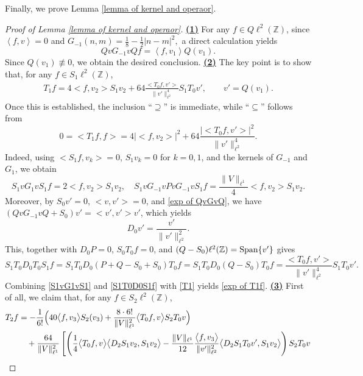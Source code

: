 \documentclass[reqno, 11pt]{amsart}
\newcommand\Z{\mathbb{Z}}
\numberwithin{equation}{section}
\begin{document}
Finally, we prove Lemma \ref{lemma of kernel and operaor}.
\begin{proof}[Proof of Lemma {\ref{lemma of kernel and operaor}}]
{\bf{\underline{(1)}}} For any $f\in Q\ell^{2}(\Z)$, since $\left<f,v\right>=0$ and $G_{-1}(n,m)=\frac{1}{8}-\frac{1}{2}|n-m|^2,$
a direct calculation yields
\begin{equation}\label{exp of QvGvQ}
QvG_{-1}vQf=\left<f,v_1\right>Q(v_1).
\end{equation}
Since $Q(v_1)\not\equiv0$, we obtain the desired conclusion. 
\vskip0.1cm
{\bf{\underline{(2)}}} The key point is to show that, for any $f\in S_1\ell^2(\Z)$,
\begin{align}\label{exp of T1f}
T_1f=4\big<f,v_2\big>S_1v_2+64\frac{\big<T_0f,v'\big>}{\|v'\|^4_{\ell^2}}S_1T_0v',\qquad v'=Q(v_1).
\end{align}
Once this is established, the inclusion ``$\supseteq$'' is immediate, while ``$\subseteq$'' follows from
$$0=\big<T_1f,f\big>=4\left|\big<f,v_2\big>\right|^2+64\frac{\left|\big<T_0f,v'\big>\right|^2}{\|v'\|^4_{\ell^2}}.$$
Indeed, using $\big<S_1f,v_k\big>=0$, $S_1v_k=0$ for $k=0,1$, and the kernels of $G_{-1}$ and $G_1$, we obtain
\begin{equation}\label{S1vG1vS1}
S_1vG_1vS_1f=2\big<f,v_2\big>S_1v_2,\quad S_1vG_{-1}vPvG_{-1}vS_1f=\frac{\|V\|_{\ell^1}}{4}\big<f,v_2\big>S_1v_2.
\end{equation}
Moreover, by $S_0v'=0$, $\big<v,v'\big>=0$, and \eqref{exp of QvGvQ}, we have
$(QvG_{-1}vQ+S_0)v'=\big<v',v'\big>v'$, which yields
\begin{equation}\label{D0v}
D_0v'=\frac{v'}{\|v'\|^2_{\ell^2}}.
\end{equation}
This, together with $D_0P=0$, $S_0T_0f=0$, and $(Q-S_0)\ell^2(\Z)={\rm Span}\{v'\}$ gives
\begin{equation}\label{S1T0D0S1f}
S_1T_0D_0T_0S_1f=S_1T_0D_0(P+Q-S_0+S_0)T_0f=S_1T_0D_0(Q-S_0)T_0f=\frac{\big<T_0f,v'\big>}{\|v'\|^4_{\ell^2}}S_1T_0v'.
\end{equation}
Combining \eqref{S1vG1vS1} and \eqref{S1T0D0S1f} with \eqref{T1} yields \eqref{exp of T1f}.
\vskip0.1cm
{\bf{\underline{(3)}}} First of all, we claim that, for any $f\in S_2\ell^2(\Z)$,
\begin{align}\label{exp of T2f}
T_2f&=-\frac{1}{6!}\Big(40\big<f,v_3\big>S_2(v_3)+\frac{8\cdot6!}{\|V\|^2_{\ell^1}}\big<T_0f,v\big>S_2T_0v\Big)\notag\\
&\quad+\frac{64}{\|V\|^2_{\ell^1}}\left[\left(\frac{1}{4}\big<T_0f,v\big>\big<D_2S_1v_2,S_1v_2\big>-\frac{\|V\|_{\ell^1}}{12}\frac{\big<f,v_3\big>}{\|v'\|^2_{\ell^2}}\big<D_2S_1T_0v',S_1v_2\big>\right)S_2T_0v\right.\\

\end{align}
\end{proof}
\end{document}
